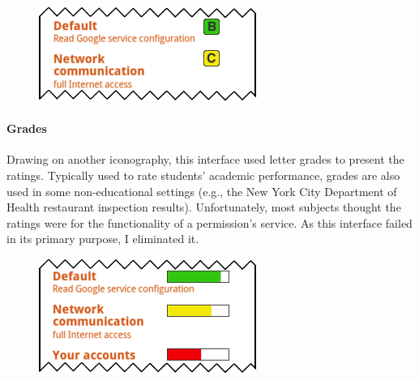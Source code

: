 \documentclass[11pt]{article}
\begin{document}
\begin{figure}
\begin{center}
\includegraphics[width=.9\linewidth]{candidate-img/grades/gradesR1.png}
\end{center}
\end{figure}

\paragraph{Grades}
\label{s-sec-grades}

Drawing on another iconography, this 
interface used letter grades to present the ratings. 
Typically used to rate students' academic performance, 
grades are also used in some non-educational settings (e.g., 
the New York City Department of Health restaurant 
inspection results).
\label{ss-sec-grades-r1}
Unfortunately, most subjects thought the ratings were for 
the functionality of a permission's service. As this interface failed
in its primary purpose, I eliminated it.


\begin{figure}
\begin{center}
\includegraphics[width=.9\linewidth]{candidate-img/bars/barsR1.png}
\end{center}
\end{figure}
\end{document}
